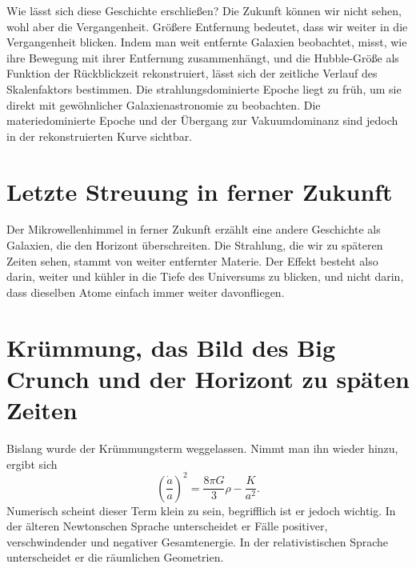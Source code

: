 Wie lässt sich diese Geschichte erschließen? Die Zukunft können wir nicht sehen, wohl aber die Vergangenheit. Größere Entfernung bedeutet, dass wir weiter in die Vergangenheit blicken. Indem man weit entfernte Galaxien beobachtet, misst, wie ihre Bewegung mit ihrer Entfernung zusammenhängt, und die Hubble-Größe als Funktion der Rückblickzeit rekonstruiert, lässt sich der zeitliche Verlauf des Skalenfaktors bestimmen. Die strahlungsdominierte Epoche liegt zu früh, um sie direkt mit gewöhnlicher Galaxienastronomie zu beobachten. Die materiedominierte Epoche und der Übergang zur Vakuumdominanz sind jedoch in der rekonstruierten Kurve sichtbar.

\section{Letzte Streuung in ferner Zukunft}

Der Mikrowellenhimmel in ferner Zukunft erzählt eine andere Geschichte als Galaxien, die den Horizont überschreiten. Die Strahlung, die wir zu späteren Zeiten sehen, stammt von weiter entfernter Materie. Der Effekt besteht also darin, weiter und kühler in die Tiefe des Universums zu blicken, und nicht darin, dass dieselben Atome einfach immer weiter davonfliegen.

\begin{classroomqa}\end{classroomqa}

\section{Krümmung, das Bild des Big Crunch und der Horizont zu späten Zeiten}

Bislang wurde der Krümmungsterm weggelassen. Nimmt man ihn wieder hinzu, ergibt sich
\begin{equation}
\left(\frac{\dot a}{a}\right)^2
=
\frac{8\pi G}{3}\rho
-
\frac{K}{a^2}.
\end{equation}
Numerisch scheint dieser Term klein zu sein, begrifflich ist er jedoch wichtig. In der älteren Newtonschen Sprache unterscheidet er Fälle positiver, verschwindender und negativer Gesamtenergie. In der relativistischen Sprache unterscheidet er die räumlichen Geometrien.


